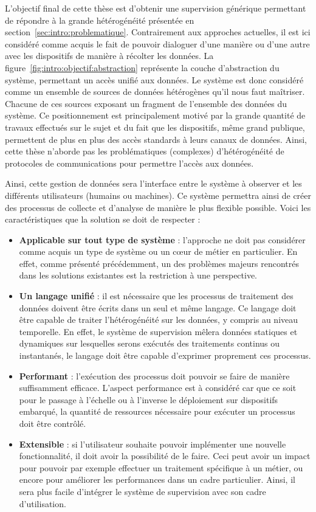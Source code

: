 L'objectif final de cette thèse est d'obtenir une supervision générique permettant de répondre à la grande hétérogénéité présentée en section~\ref{sec:intro:problematique}. Contrairement aux approches actuelles, il est ici considéré comme acquis le fait de pouvoir dialoguer d'une manière ou d'une autre avec les dispositifs de manière à récolter les données. La figure~\ref{fig:intro:objectif:abstraction} représente la couche d'abstraction du système, permettant un accès unifié aux données. Le système est donc considéré comme un ensemble de sources de données hétérogènes qu'il nous faut maîtriser. Chacune de ces sources exposant un fragment de l'ensemble des données du système. Ce positionnement est principalement motivé par la grande quantité de travaux effectués sur le sujet et du fait que les dispositifs, même grand publique, permettent de plus en plus des accès standards à leurs canaux de données. Ainsi, cette thèse n'aborde pas les problématiques (complexes) d'hétérogénéité de protocoles de communications pour permettre l'accès aux données.

Ainsi, cette gestion de données sera l'interface entre le système à observer et les différents utilisateurs (humains ou machines). Ce système permettra ainsi de créer des processus de collecte et d'analyse de manière le plus flexible possible. Voici les caractéristiques que la solution se doit de respecter :
\begin{itemize}
    \item \textbf{Applicable sur tout type de système} : l'approche ne doit pas considérer comme acquis un type de système ou un cœur de métier en particulier. En effet, comme présenté précédemment, un des problèmes majeurs rencontrés dans les solutions existantes est la restriction à une perspective.
    \item \textbf{Un langage unifié} : il est nécessaire que les processus de traitement des données doivent être écrits dans un seul et même langage. Ce langage doit être capable de traiter l'hétérogénéité sur les données, y compris au niveau temporelle. En effet, le système de supervision mêlera données statiques et dynamiques sur lesquelles serons exécutés des traitements continus ou instantanés, le langage doit être capable d'exprimer proprement ces processus.
    \item \textbf{Performant} : l'exécution des processus doit pouvoir se faire de manière suffisamment efficace. L'aspect performance est à considéré car que ce soit pour le passage à l'échelle ou à l'inverse le déploiement sur dispositifs embarqué, la quantité de ressources nécessaire pour exécuter un processus doit être contrôlé.
    \item \textbf{Extensible} : si l'utilisateur souhaite pouvoir implémenter une nouvelle fonctionnalité, il doit avoir la possibilité de le faire. Ceci peut avoir un impact pour pouvoir par exemple effectuer un traitement spécifique à un métier, ou encore pour améliorer les performances dans un cadre particulier. Ainsi, il sera plus facile d'intégrer le système de supervision avec son cadre d'utilisation.
\end{itemize}
